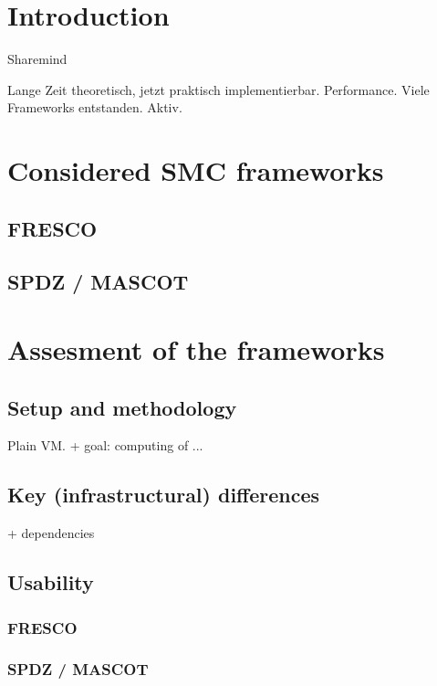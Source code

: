 
\section{Introduction}

\cite{cryptoeprint:2016:505}

Sharemind

Lange Zeit theoretisch, jetzt praktisch implementierbar. Performance.
Viele Frameworks entstanden. Aktiv.


\section{Considered SMC frameworks}

\subsection{FRESCO}

\subsection{SPDZ / MASCOT}




\section{Assesment of the frameworks}

\subsection{Setup and methodology}

Plain VM. + goal: computing of ...

\subsection{Key (infrastructural) differences}

+ dependencies


\subsection{Usability}

\subsubsection{FRESCO}

\subsubsection{SPDZ / MASCOT}



